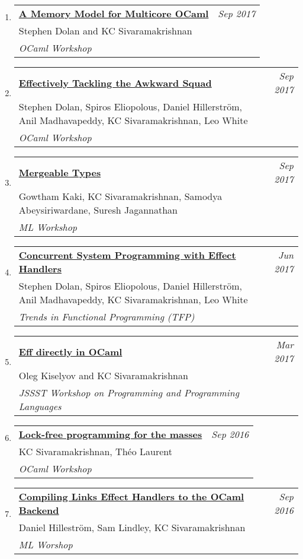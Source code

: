 \documentclass[10pt]{article}
\makeatletter
\newcommand{\lbar}[1]{{\color{#1}\ding{118}}\hspace*{2pt}}
\newenvironment{benumerate}[2]{
    \let\oldItem\item
    \def\item{\addtocounter{enumi}{-2}\oldItem}
    \begin{enumerate}[#2] \itemsep3pt
    \setcounter{enumi}{#1}
    \addtocounter{enumi}{1}}
  {\end{enumerate}}
\newenvironment{publication}[5]
{ \item
  \begin{tabular*}{7.5in}{p{6.3in}@{\extracolsep{\fill}}r}
    \href{#1}{\textbf{#2}} & \textit{#3}\\ #4 &\\ \textit{#5}&\\
  \end{tabular*}
} {}
\newenvironment{region}[3]{%
  \vspace*{0.5ex}
  {\scalebox{1.4}{\textbf{#1}}}
  \begin{benumerate}{#3}{\color{RoyalBlue}#2}}
  {\end{benumerate}\vspace{0.8ex}}
\makeatother
\begin{document}
\begin{region} {\lbar{purple}Workshop Publications}{{W}1}{13}

	\begin{publication}{http://kcsrk.info/papers/memory_model_ocaml17.pdf}
		{A Memory Model for Multicore OCaml}
		{Sep 2017}{Stephen Dolan and KC Sivaramakrishnan}
		{OCaml Workshop}
	\end{publication}

	\begin{publication}{http://kcsrk.info/papers/awkward_effects_ml17.pdf}
		{Effectively Tackling the Awkward Squad}
		{Sep 2017}{Stephen Dolan, Spiros Eliopolous, Daniel Hillerström, Anil Madhavapeddy, KC Sivaramakrishnan, Leo White}
		{OCaml Workshop}
	\end{publication}

	\begin{publication}{http://kcsrk.info/papers/mergeable_types_ml17.pdf}
		{Mergeable Types}
		{Sep 2017}{Gowtham Kaki, KC Sivaramakrishnan, Samodya Abeysiriwardane, Suresh Jagannathan}
		{ML Workshop}
	\end{publication}

	\begin{publication}{http://kcsrk.info/papers/system_effects_may_17.pdf}
		{Concurrent System Programming with Effect Handlers}
		{Jun 2017}{Stephen Dolan, Spiros Eliopolous, Daniel Hillerström, Anil Madhavapeddy, KC Sivaramakrishnan, Leo White}
		{Trends in Functional Programming (TFP)}
	\end{publication}

	\begin{publication}{http://kcsrk.info/papers/eff_ocaml_ppl17.pdf}
		{Eff directly in OCaml}
		{Mar 2017}{Oleg Kiselyov and KC Sivaramakrishnan}
		{JSSST Workshop on Programming and Programming Languages}
	\end{publication}

	\begin{publication}{http://kcsrk.info/papers/reagents_ocaml16.pdf}
		{Lock-free programming for the masses}
		{Sep 2016}{KC Sivaramakrishnan, Théo Laurent}
		{OCaml Workshop}
	\end{publication}

	\begin{publication}{http://kcsrk.info/papers/links_ocaml_ml16.pdf}
		{Compiling Links Effect Handlers to the OCaml Backend}
		{Sep 2016}{Daniel Hilleström, Sam Lindley, KC Sivaramakrishnan}
		{ML Worshop}
	\end{publication}


\end{region}
\end{document}
